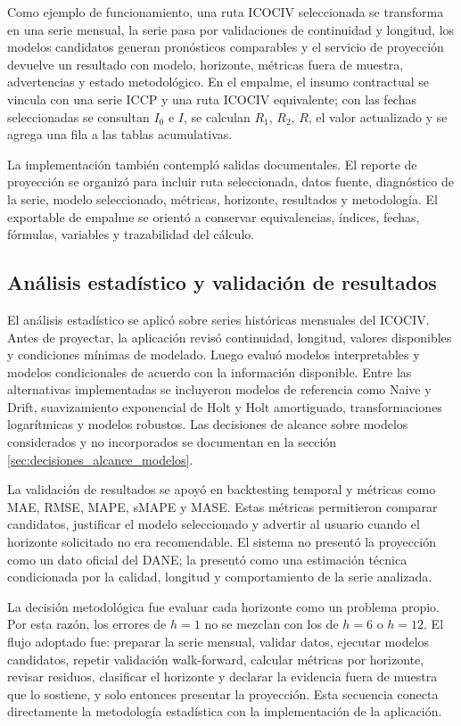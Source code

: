 \documentclass[12pt,letterpaper]{article}
\newcommand{\ICOCIV}{ICOCIV}
\newcommand{\ICCP}{ICCP}
\newcommand{\DANE}{DANE}
\begin{document}
Como ejemplo de funcionamiento, una ruta \ICOCIV{} seleccionada se transforma en una serie mensual, la serie pasa por validaciones de continuidad y longitud, los modelos candidatos generan pronósticos comparables y el servicio de proyección devuelve un resultado con modelo, horizonte, métricas fuera de muestra, advertencias y estado metodológico. En el empalme, el insumo contractual se vincula con una serie \ICCP{} y una ruta \ICOCIV{} equivalente; con las fechas seleccionadas se consultan \(I_0\) e \(I\), se calculan \(R_1\), \(R_2\), \(R\), el valor actualizado y se agrega una fila a las tablas acumulativas.

La implementación también contempló salidas documentales. El reporte de proyección se organizó para incluir ruta seleccionada, datos fuente, diagnóstico de la serie, modelo seleccionado, métricas, horizonte, resultados y metodología. El exportable de empalme se orientó a conservar equivalencias, índices, fechas, fórmulas, variables y trazabilidad del cálculo.

\subsection{Análisis estadístico y validación de resultados}

El análisis estadístico se aplicó sobre series históricas mensuales del \ICOCIV. Antes de proyectar, la aplicación revisó continuidad, longitud, valores disponibles y condiciones mínimas de modelado. Luego evaluó modelos interpretables y modelos condicionales de acuerdo con la información disponible. Entre las alternativas implementadas se incluyeron modelos de referencia como Naive y Drift, suavizamiento exponencial de Holt y Holt amortiguado, transformaciones logarítmicas y modelos robustos. Las decisiones de alcance sobre modelos considerados y no incorporados se documentan en la sección \ref{sec:decisiones_alcance_modelos}.

La validación de resultados se apoyó en backtesting temporal y métricas como MAE, RMSE, MAPE, sMAPE y MASE. Estas métricas permitieron comparar candidatos, justificar el modelo seleccionado y advertir al usuario cuando el horizonte solicitado no era recomendable. El sistema no presentó la proyección como un dato oficial del \DANE; la presentó como una estimación técnica condicionada por la calidad, longitud y comportamiento de la serie analizada.

La decisión metodológica fue evaluar cada horizonte como un problema propio. Por esta razón, los errores de \(h=1\) no se mezclan con los de \(h=6\) o \(h=12\). El flujo adoptado fue: preparar la serie mensual, validar datos, ejecutar modelos candidatos, repetir validación walk-forward, calcular métricas por horizonte, revisar residuos, clasificar el horizonte y declarar la evidencia fuera de muestra que lo sostiene, y solo entonces presentar la proyección. Esta secuencia conecta directamente la metodología estadística con la implementación de la aplicación.
\end{document}
